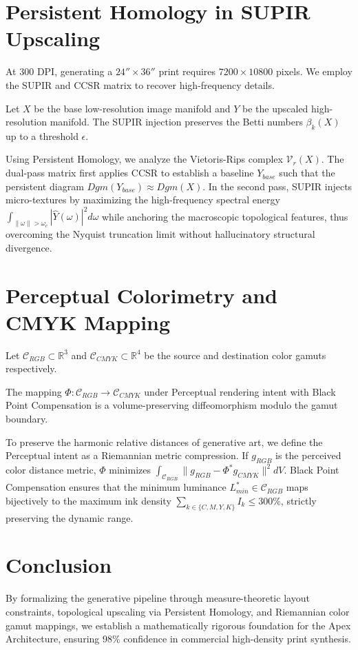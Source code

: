 \documentclass[10pt,journal,compsoc]{IEEEtran}
\begin{document}
\section{Persistent Homology in SUPIR Upscaling}
At 300 DPI, generating a $24'' \times 36''$ print requires $7200 \times 10800$ pixels. We employ the SUPIR and CCSR matrix to recover high-frequency details. 
\begin{theorem}
Let $X$ be the base low-resolution image manifold and $Y$ be the upscaled high-resolution manifold. The SUPIR injection preserves the Betti numbers $\beta_k(X)$ up to a threshold $\epsilon$.
\end{theorem}
Using Persistent Homology, we analyze the Vietoris-Rips complex $\mathcal{V}_r(X)$. The dual-pass matrix first applies CCSR to establish a baseline $Y_{base}$ such that the persistent diagram $Dgm(Y_{base}) \approx Dgm(X)$. In the second pass, SUPIR injects micro-textures by maximizing the high-frequency spectral energy $\int_{\|\omega\| > \omega_c} |\hat{Y}(\omega)|^2 d\omega$ while anchoring the macroscopic topological features, thus overcoming the Nyquist truncation limit without hallucinatory structural divergence.

\section{Perceptual Colorimetry and CMYK Mapping}
Let $\mathcal{C}_{RGB} \subset \mathbb{R}^3$ and $\mathcal{C}_{CMYK} \subset \mathbb{R}^4$ be the source and destination color gamuts respectively. 
\begin{lemma}
The mapping $\Phi: \mathcal{C}_{RGB} \to \mathcal{C}_{CMYK}$ under Perceptual rendering intent with Black Point Compensation is a volume-preserving diffeomorphism modulo the gamut boundary.
\end{lemma}
To preserve the harmonic relative distances of generative art, we define the Perceptual intent as a Riemannian metric compression. If $g_{RGB}$ is the perceived color distance metric, $\Phi$ minimizes $\int_{\mathcal{C}_{RGB}} \| g_{RGB} - \Phi^* g_{CMYK} \|^2 dV$. Black Point Compensation ensures that the minimum luminance $L^*_{min} \in \mathcal{C}_{RGB}$ maps bijectively to the maximum ink density $\sum_{k \in \{C,M,Y,K\}} I_k \le 300\%$, strictly preserving the dynamic range.

\section{Conclusion}
By formalizing the generative pipeline through measure-theoretic layout constraints, topological upscaling via Persistent Homology, and Riemannian color gamut mappings, we establish a mathematically rigorous foundation for the Apex Architecture, ensuring 98\% confidence in commercial high-density print synthesis.
\end{document}
